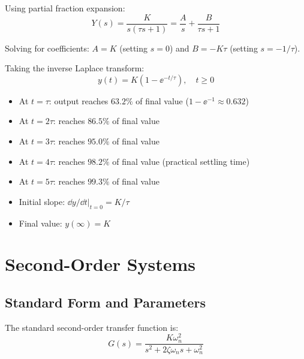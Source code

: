 Using partial fraction expansion:
\begin{equation}
Y(s) = \frac{K}{s(\tau s + 1)} = \frac{A}{s} + \frac{B}{\tau s + 1}
\end{equation}

Solving for coefficients: $A = K$ (setting $s = 0$) and $B = -K\tau$ (setting $s = -1/\tau$).

Taking the inverse Laplace transform:
\begin{equation}
\boxed{y(t) = K\left(1 - \ee^{-t/\tau}\right), \quad t \geq 0}
\label{eq:first_order_step}
\end{equation}

\begin{keyconceptbox}[title=First-Order Step Response Characteristics]
\begin{itemize}
    \item At $t = \tau$: output reaches $63.2\%$ of final value ($1 - \ee^{-1} \approx 0.632$)
    \item At $t = 2\tau$: reaches $86.5\%$ of final value
    \item At $t = 3\tau$: reaches $95.0\%$ of final value
    \item At $t = 4\tau$: reaches $98.2\%$ of final value (practical settling time)
    \item At $t = 5\tau$: reaches $99.3\%$ of final value
    \item Initial slope: $\dd y/\dd t|_{t=0} = K/\tau$
    \item Final value: $y(\infty) = K$
\end{itemize}
\end{keyconceptbox}

\section{Second-Order Systems}
\label{sec:second_order}

\subsection{Standard Form and Parameters}

The standard second-order transfer function is:
\begin{equation}
G(s) = \frac{K\omega_n^2}{s^2 + 2\zeta\omega_n s + \omega_n^2}
\label{eq:second_order_tf}
\end{equation}

